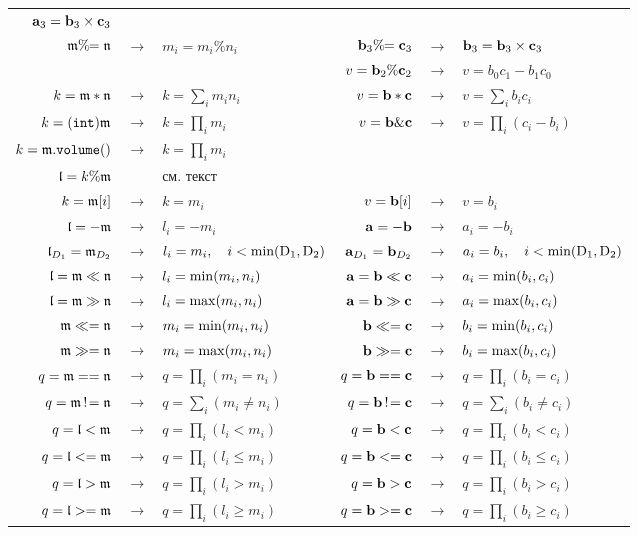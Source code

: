 \begin{table}
\begin{center}
\begin{tabular}{|rcl|rcl|}
$\mathbf{a}_3 = \mathbf{b}_3 \times \mathbf{c}_3$ \\
$\mathfrak{m} \%\!\!= \mathfrak{n}$ &$\to$& $m_i=m_i\% n_i$ & $\mathbf{b}_3 \%\!\!= \mathbf{c}_3$ &$\to$&
$\mathbf{b}_3 = \mathbf{b}_3 \times \mathbf{c}_3$ \\
&&&  $v = \mathbf{b}_2 \% \mathbf{c}_2$ &$\to$& $ v =  b_0c_1-b_1c_0$ \\
\hline
$k=\mathfrak{m}\ast \mathfrak{n}$ &$\to$& $k=\sum_i m_i  n_i$ & $v =\mathbf{b}\ast \mathbf{c}$ &$\to$& $v =
\sum_i b_i  c_i$  \\
$k={\tt (int)}\mathfrak{m}$ &$\to$& $ k=\prod_i m_i $ & $v = \mathbf{b} \& \mathbf{c}$ &$\to$& $v=\prod_i(c_i-b_i)$\\
$k=\mathfrak{m}.{\tt volume()}$ &$\to$& $ k=\prod_i m_i $ &&& \\
$\mathfrak{l}=k\%\mathfrak{m}$ && см. текст &&& \\
\hline
$ k = \mathfrak{m}[i]$ &$\to$& $k = m_i$ & $ v = \mathbf{b}[i]$ &$\to$& $v = b_i$ \\
$ \mathfrak{l} = -\mathfrak{m}$ &$\to$& $l_i = -m_i$ & $ \mathbf{a} = -\mathbf{b}$ &$\to$& $a_i = -b_i$ \\
$ \mathfrak{l}_{D_1} = \mathfrak{m}_{D_2}$ &$\to$& $l_i = m_i,\quad i < {\rm min(D_1,D_2)}$ & $
\mathbf{a}_{D_1} = \mathbf{b}_{D_2}$ &$\to$& $a_i = b_i,\quad  i < {\rm min(D_1,D_2)}$\\
\hline
$ \mathfrak{l} = \mathfrak{m} \ll \mathfrak{n}$ &$\to$& $l_i = {\rm min}(m_i,n_i)$ & $ \mathbf{a} = \mathbf{b} \ll \mathbf{c}$ &$\to$& $a_i = {\rm min}(b_i,c_i)$\\
$ \mathfrak{l} = \mathfrak{m} \gg \mathfrak{n}$ &$\to$& $l_i = {\rm max}(m_i,n_i)$ & $ \mathbf{a} = \mathbf{b} \gg \mathbf{c}$ &$\to$& $a_i = {\rm max}(b_i,c_i)$\\
$ \mathfrak{m} \ll= \mathfrak{n}$ &$\to$& $m_i = {\rm min}(m_i,n_i)$ & $ \mathbf{b} \ll= \mathbf{c}$ &$\to$& $b_i = {\rm min}(b_i,c_i)$\\
$ \mathfrak{m} \gg= \mathfrak{n}$ &$\to$& $m_i = {\rm max}(m_i,n_i)$ & $ \mathbf{b} \gg= \mathbf{c}$ &$\to$& $b_i = {\rm max}(b_i,c_i)$\\
\hline
$ q = \mathfrak{m} == \mathfrak{n}$ &$\to$& $q = \prod_i (m_i=n_i)$  &  $ q = \mathbf{b} == \mathbf{c}$ &$\to$& $q = \prod_i (b_i=c_i)$  \\
$ q = \mathfrak{m} \,!\!= \mathfrak{n}$ &$\to$& $q = \sum_i (m_i\neq n_i)$  &  $ q = \mathbf{b} \,!\!= \mathbf{c}$ &$\to$&
$q = \sum_i (b_i\neq c_i)$  \\
$ q = \mathfrak{l} < \mathfrak{m}$ &$\to$& $q = \prod_i (l_i<m_i)$   &  $ q = \mathbf{b} < \mathbf{c}$ &$\to$& $q = \prod_i (b_i<c_i)$  \\
$ q = \mathfrak{l} <= \mathfrak{m}$ &$\to$& $q = \prod_i(l_i\leq m_i)$  &  $ q = \mathbf{b} <= \mathbf{c}$ &$\to$& $q = \prod_i(b_i\leq c_i)$  \\
$ q = \mathfrak{l} > \mathfrak{m}$ &$\to$& $q = \prod_i (l_i>m_i)$  &  $ q = \mathbf{b} > \mathbf{c}$ &$\to$& $q = \prod_i (b_i>c_i)$  \\
$ q = \mathfrak{l} >= \mathfrak{m}$ &$\to$& $q = \prod_i(l_i\geq m_i)$  &  $ q = \mathbf{b} >= \mathbf{c}$ &$\to$& $q = \prod_i(b_i\geq c_i)$  \\

\end{tabular}
\end{center}
\end{table}
